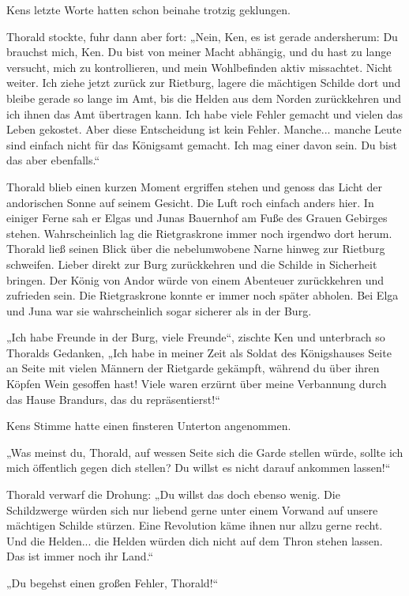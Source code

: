 \documentclass[10pt, a4paper, oneside]{book}
\begin{document}
Kens letzte Worte hatten schon beinahe trotzig geklungen.

Thorald stockte, fuhr dann aber fort: „Nein, Ken, es ist gerade andersherum: Du brauchst mich, Ken. Du bist von meiner Macht abhängig, und du hast zu lange versucht, mich zu kontrollieren, und mein Wohlbefinden aktiv missachtet. Nicht weiter. Ich ziehe jetzt zurück zur Rietburg, lagere die mächtigen Schilde dort und bleibe gerade so lange im Amt, bis die Helden aus dem Norden zurückkehren und ich ihnen das Amt übertragen kann. Ich habe viele Fehler gemacht und vielen das Leben gekostet. Aber diese Entscheidung ist kein Fehler. Manche... manche Leute sind einfach nicht für das Königsamt gemacht. Ich mag einer davon sein. Du bist das aber ebenfalls.“

Thorald blieb einen kurzen Moment ergriffen stehen und genoss das Licht der andorischen Sonne auf seinem Gesicht. Die Luft roch einfach anders hier. In einiger Ferne sah er Elgas und Junas Bauernhof am Fuße des Grauen Gebirges stehen. Wahrscheinlich lag die Rietgraskrone immer noch irgendwo dort herum. Thorald ließ seinen Blick über die nebelumwobene Narne hinweg zur Rietburg schweifen. Lieber direkt zur Burg zurückkehren und die Schilde in Sicherheit bringen. Der König von Andor würde von einem Abenteuer zurückkehren und zufrieden sein. Die Rietgraskrone konnte er immer noch später abholen. Bei Elga und Juna war sie wahrscheinlich sogar sicherer als in der Burg.

„Ich habe Freunde in der Burg, viele Freunde“, zischte Ken und unterbrach so Thoralds Gedanken, „Ich habe in meiner Zeit als Soldat des Königshauses Seite an Seite mit vielen Männern der Rietgarde gekämpft, während du über ihren Köpfen Wein gesoffen hast! Viele waren erzürnt über meine Verbannung durch das Hause Brandurs, das du repräsentierst!“

Kens Stimme hatte einen finsteren Unterton angenommen.

„Was meinst du, Thorald, auf wessen Seite sich die Garde stellen würde, sollte ich mich öffentlich gegen dich stellen? Du willst es nicht darauf ankommen lassen!“

Thorald verwarf die Drohung: „Du willst das doch ebenso wenig. Die Schildzwerge würden sich nur liebend gerne unter einem Vorwand auf unsere mächtigen Schilde stürzen. Eine Revolution käme ihnen nur allzu gerne recht. Und die Helden... die Helden würden dich nicht auf dem Thron stehen lassen. Das ist immer noch ihr Land.“

„Du begehst einen großen Fehler, Thorald!“
\end{document}
